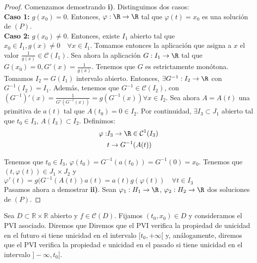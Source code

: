 \documentclass{article}
\begin{document}
\begin{proof}
  Comenzamos demostrando \textbf{i)}. Distinguimos dos casos:\\

  \textbf{Caso 1:} $g(x_0) = 0$. Entonces, $\varphi: \R \to \R$ tal
  que
  $\varphi(t) = x_0$ es una solución de $(P)$.\\

  \textbf{Caso 2:} $g(x_0) \neq 0$. Entonces, existe $I_1$ abierto tal
  que $x_0 \in I_1, g(x) \neq 0 \quad \forall x \in I_1$. Tomamos
  entonces la aplicación que asigna a $x$ el valor
  $\frac{1}{g(x)} \in \mathcal{C}(I_1)$.  Sea ahora la aplicación
  $ G: I_1 \to \R$ tal que $G(x_0) = 0, G'(x) = \frac{1}{g(x)}$.
  Tenemos que $G$ es estrictamente monótona. Tomamos $I_2 = G(I_1)$
  intervalo abierto. Entonces, $\exists G^{-1}: I_2 \to \R$ con
  $G^{-1}(I_2) = I_1$. Además, tenemos que
  $G^{-1} \in \mathcal{C}(I_2)$, con
  $(G^{-1})' (x) = \frac{1}{G'(G^{-1}(x))} = g(G^{-1}(x)) \forall x
  \in I_2$.
  Sea ahora $A = A(t)$ una primitiva de $a(t)$ tal que
  $A(t_0) = 0 \in I_2$.  Por continuidad, $\exists I_3 \subset J_1$
  abierto tal que $t_0 \in I_3$, $A(I_3) \subset I_2$. Definimos:
  \begin{align*}
    \varphi : & I_3 \to \R \in \mathcal{C}^1(I_3) \\
              & t \to G^{-1}(A(t))
  \end{align*}

  Tenemos que $t_0 \in I_3$,
  $\varphi(t_0) = G^{-1}(a(t_0)) = G^{-1}(0) = x_0$. Tenemos que
  $(t, \varphi(t)) \in J_1 \times J_2$ y
  $\varphi'(t) = g(G^{-1}(A(t))a(t) = a(t)g(\varphi(t)) \quad \forall
  t \in I_3$ \\

  Pasamos ahora a demostrar \textbf{ii)}. Sean
  $\varphi_1: H_1 \to \R$, $\varphi_2: H_2 \to \R$ dos soluciones de
  $(P)$.
\end{proof}

\begin{definition}
  \label{def:unicidad-futuro}
  Sea $D \subset \mathbb{R} \times \mathbb{R}$ abierto y
  $f \in \mathcal{C}(D)$. Fijamos $(t_0, x_0) \in D$ y consideramos el
  PVI asociado. Diremos que Diremos que el PVI verifica la propiedad
  de unicidad en el futuro si tiene unicidad en el intervalo
  $[t_0, +\infty[$ y, análogamente, diremos que el PVI verifica la
  propiedad e unicidad en el pasado si tiene unicidad en el intervalo
  $]-\infty, t_0]$.
\end{definition}
\end{document}
